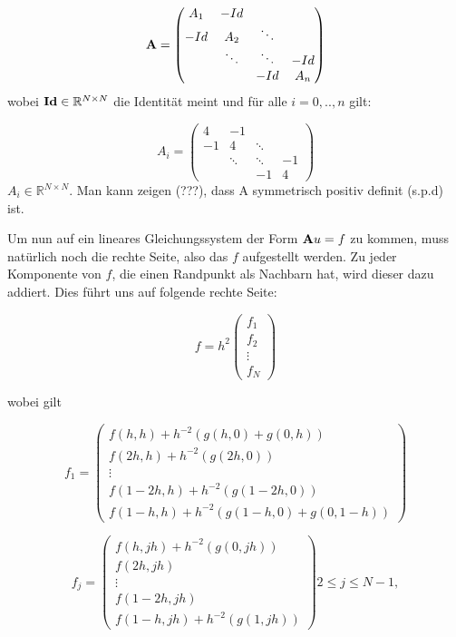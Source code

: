 \begin{equation}
{\textbf{A}} =
\begin{pmatrix}
A_{1} & -Id \\
-Id & A_{2} & \ddots \\
 & \ddots & \ddots & -Id \\
 & & -Id & A_{n}
\end{pmatrix}\label{eq.PoissonMatrix}
\end{equation}
wobei ${\textbf{Id}} \in \mathbb{R}^{N \times N}$ die Identität meint und für alle $i = 0,..,n$ gilt:

\begin{equation}
A_{i} = 
\begin{pmatrix}
4 & -1 & & \\
-1 & 4 & \ddots & \\
 & \ddots & \ddots & -1 \\
 & & -1 & 4
\end{pmatrix}
\end{equation}
$A_{i} \in \mathbb{R}^{N \times N}$. Man kann zeigen (???), dass A symmetrisch positiv definit (s.p.d) ist.

Um nun auf ein lineares Gleichungssystem der Form ${\textbf{A}}u = f$ zu kommen, muss natürlich noch die rechte Seite, also das $f$ aufgestellt werden. Zu jeder Komponente von $f$, die einen Randpunkt als Nachbarn hat, wird dieser dazu addiert. Dies führt uns auf folgende rechte Seite:

\begin{equation}
f = h^{2}
\begin{pmatrix}
f_{1} \\ f_{2} \\ \vdots \\ f_{N}
\end{pmatrix}
\end{equation}

wobei gilt

\begin{equation}
f_{1} = 
\begin{pmatrix}
f(h,h) + h^{-2}(g(h,0)+g(0,h)) \\
f(2h,h) + h^{-2}(g(2h,0)) \\
\vdots \\
f(1-2h,h) + h^{-2}(g(1-2h,0)) \\
f(1-h,h) + h^{-2}(g(1-h,0)+g(0,1-h))
\end{pmatrix}
\end{equation}

\begin{equation}
f_{j} = 
\begin{pmatrix}
f(h,jh) + h^{-2}(g(0,jh)) \\
f(2h,jh) \\
\vdots \\
f(1-2h,jh) \\
f(1-h,jh) + h^{-2}(g(1,jh))
\end{pmatrix}
2 \le j \le N-1,
\end{equation}

